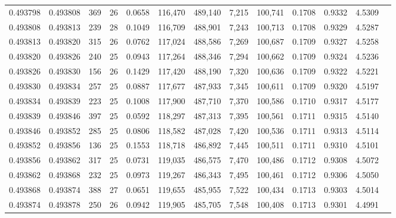 \begin{tabular}{rrrrrrrrrrrrr}
0.493798 & 0.493808 & 369 &  26 &                                     0.0658 & 116,470 & 489,140 &   7,215 & 100,741 & 0.1708 & 0.9332 & 4.5309 \\
0.493808 & 0.493813 & 239 &  28 &                                     0.1049 & 116,709 & 488,901 &   7,243 & 100,713 & 0.1708 & 0.9329 & 4.5287 \\
0.493813 & 0.493820 & 315 &  26 &                                     0.0762 & 117,024 & 488,586 &   7,269 & 100,687 & 0.1709 & 0.9327 & 4.5258 \\
0.493820 & 0.493826 & 240 &  25 &                                     0.0943 & 117,264 & 488,346 &   7,294 & 100,662 & 0.1709 & 0.9324 & 4.5236 \\
0.493826 & 0.493830 & 156 &  26 &                                     0.1429 & 117,420 & 488,190 &   7,320 & 100,636 & 0.1709 & 0.9322 & 4.5221 \\
0.493830 & 0.493834 & 257 &  25 &                                     0.0887 & 117,677 & 487,933 &   7,345 & 100,611 & 0.1709 & 0.9320 & 4.5197 \\
0.493834 & 0.493839 & 223 &  25 &                                     0.1008 & 117,900 & 487,710 &   7,370 & 100,586 & 0.1710 & 0.9317 & 4.5177 \\
0.493839 & 0.493846 & 397 &  25 &                                     0.0592 & 118,297 & 487,313 &   7,395 & 100,561 & 0.1711 & 0.9315 & 4.5140 \\
0.493846 & 0.493852 & 285 &  25 &                                     0.0806 & 118,582 & 487,028 &   7,420 & 100,536 & 0.1711 & 0.9313 & 4.5114 \\
0.493852 & 0.493856 & 136 &  25 &                                     0.1553 & 118,718 & 486,892 &   7,445 & 100,511 & 0.1711 & 0.9310 & 4.5101 \\
0.493856 & 0.493862 & 317 &  25 &                                     0.0731 & 119,035 & 486,575 &   7,470 & 100,486 & 0.1712 & 0.9308 & 4.5072 \\
0.493862 & 0.493868 & 232 &  25 &                                     0.0973 & 119,267 & 486,343 &   7,495 & 100,461 & 0.1712 & 0.9306 & 4.5050 \\
0.493868 & 0.493874 & 388 &  27 &                                     0.0651 & 119,655 & 485,955 &   7,522 & 100,434 & 0.1713 & 0.9303 & 4.5014 \\
0.493874 & 0.493878 & 250 &  26 &                                     0.0942 & 119,905 & 485,705 &   7,548 & 100,408 & 0.1713 & 0.9301 & 4.4991 \\

\end{tabular}
